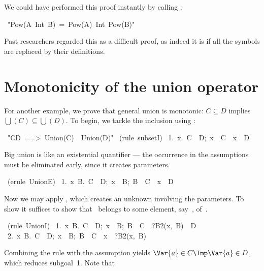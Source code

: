 We could have performed this proof instantly by calling
:
\begin{isabelle}
\ "Pow(A\ Int\ B)\ =\ Pow(A)\ Int\ Pow(B)"\isanewline
{}
\end{isabelle}
Past researchers regarded this as a difficult proof, as indeed it is if all
the symbols are replaced by their definitions.
\goodbreak

\section{Monotonicity of the union operator}
For another example, we prove that general union is monotonic:
${C\subseteq D}$ implies $\bigcup(C)\subseteq \bigcup(D)$.  To begin, we
tackle the inclusion using :
\begin{isabelle}
\ "C\isasymsubseteq D\ ==>\ Union(C)\
\isasymsubseteq \ Union(D)"\isanewline
{}\ (rule\ subsetI)\isanewline
\ 1.\ \isasymAnd x.\ \isasymlbrakk C\ \isasymsubseteq \ D;\ x\ \isasymin \ \isasymUnion C\isasymrbrakk \ \isasymLongrightarrow \ x\ \isasymin \ \isasymUnion D%
\end{isabelle}
Big union is like an existential quantifier --- the occurrence in the
assumptions must be eliminated early, since it creates parameters.
\index{*UnionE theorem}
\begin{isabelle}
\ (erule\ UnionE)\isanewline
\ 1.\ \isasymAnd x\ B.\ \isasymlbrakk C\ \isasymsubseteq \ D;\ x\ \isasymin \ B;\ B\ \isasymin \ C\isasymrbrakk \ \isasymLongrightarrow \ x\ \isasymin \ \isasymUnion D%
\end{isabelle}
Now we may apply , which creates an unknown involving the
parameters.  To show \isa{x\ \isasymin \ \isasymUnion D} it suffices to show that~ belongs
to some element, say~\isa{?B2(x,B)}, of~\isa{D}\@.
\begin{isabelle}
\ (rule\ UnionI)\isanewline
\ 1.\ \isasymAnd x\ B.\ \isasymlbrakk C\ \isasymsubseteq \ D;\ x\ \isasymin \ B;\ B\ \isasymin \ C\isasymrbrakk \ \isasymLongrightarrow \ ?B2(x,\ B)\ \isasymin \ D\isanewline
\ 2.\ \isasymAnd x\ B.\ \isasymlbrakk C\ \isasymsubseteq \ D;\ x\ \isasymin \ B;\ B\ \isasymin \ C\isasymrbrakk \ \isasymLongrightarrow \ x\ \isasymin \ ?B2(x,\ B)
\end{isabelle}
Combining the rule  with the assumption  yields 
$\Var{a}\in C \Imp \Var{a}\in D$, which reduces subgoal~1.  Note that
